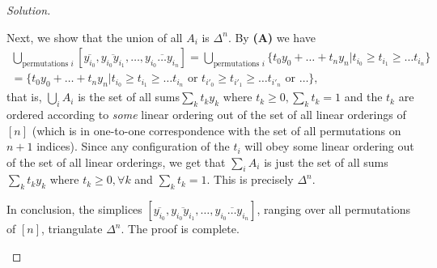 \begin{proof}[Solution]
\begin{enumerate}[font=\scshape,label=\textbf{(\Alph*)}, wide]
Next, we show that the union of all $A_i$ is $\Delta^n$. By \textbf{(A)} we have
\[
\begin{aligned}
\bigcup_{\text{permutations } i}  [\overline{y_{i_0}}, \overline{y_{i_0}y_{i_1}}, \ldots , \overline{y_{i_0}\ldots y_{i_n}}] = \bigcup_{\text{permutations } i} \{t_0 y_0 + \ldots + t_n y_n | t_{i_0} \geq t_{i_1} \geq \ldots t_{i_n} \} \\
= \{t_0 y_0 + \ldots + t_n y_n | t_{i_0} \geq t_{i_1} \geq \ldots t_{i_n} \text{ or } t_{i'_0} \geq t_{i'_1} \geq \ldots t_{i'_n} \text{ or } \ldots\},
\end{aligned}
\]
that is, $\bigcup_i A_i$ is the set of all sums$ \sum_k t_ky_k$ where $t_k \geq 0, \sum_k t_k = 1$ and the $t_k$ are ordered according to \emph{some} linear ordering out of the set of all linear orderings of $[n]$ (which is in one-to-one correspondence with the set of all permutations on $n+1$ indices). Since any configuration of the $t_i$ will obey some linear ordering out of the set of all linear orderings, we get that $\sum_i A_i$ is just the set of all sums $\sum_k t_ky_k$ where $ t_k \geq 0,\forall k$ and $\sum_k t_k =1$. This is precisely $\Delta^n$.

In conclusion, the simplices $[\overline{y_{i_0}}, \overline{y_{i_0}y_{i_1}}, \ldots , \overline{y_{i_0}\ldots y_{i_n}}]$, ranging over all permutations of $[n]$, triangulate $\Delta^n$. The proof is complete.
\end{enumerate}
\end{proof}
\newpage

